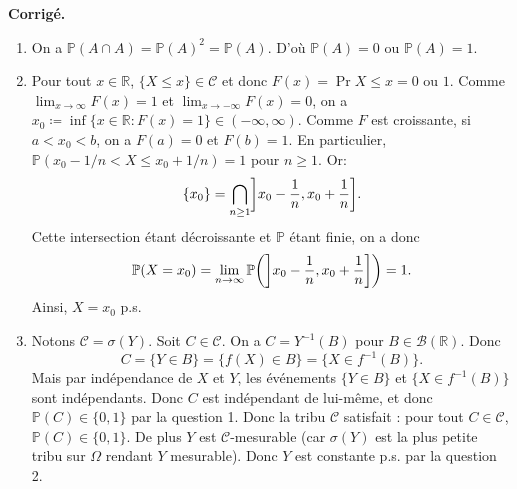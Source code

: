 \documentclass[a4paper,11pt]{article}
\let\originalleft\left
\let\originalright\right
\renewcommand{\left}{\mathopen{}\mathclose\bgroup\originalleft}
\renewcommand{\right}{\aftergroup\egroup\originalright}
\newcommand{\R}{\mathbb{R}}
\renewcommand{\P}{\mathbb{P}}
\newcommand{\1}{\mathbbm{1}}
\newcommand{\cB}{\mathcal{B}}
\newcommand{\cC}{\mathcal{C}}
\theoremstyle{plain}
\theoremstyle{definition}
\renewenvironment{comment}{\medskip\noindent \textcolor{BrickRed}{\textbf{Corrigé.}}}{}
\begin{document}
\begin{comment}
\begin{enumerate}
\item On a $\P(A \cap A)= \P(A)^2= \P(A)$. D'où $\P(A)=0$ ou $\P(A)=1$.
\item Pour tout $x \in \R$, $\{X \leq x\} \in \mathcal{C}$ et donc $F(x) = \Pr{X \leq x}=0$ ou $1$.
Comme $\lim_{x \rightarrow \infty} F(x)=1$ et $\lim_{x \rightarrow -\infty} F(x)=0$, on a $x_0 \coloneqq \inf  \{x \in \R : F(x)=1\} \in (- \infty, \infty)$.
Comme $F$ est croissante, si $a<x_0<b$, on a $F(a)=0$ et $F(b)=1$.
En particulier, $ \P( x_0-1/n < X \leq x_0+1/n)=1$ pour $n \geq 1$.
Or:
\[
	\{x_0\}= \bigcap_{n \geq 1} \left] x_0- \frac{1}{n}, x_{0}+ \frac{1}{n} \right].
\]
Cette intersection \'etant d\'ecroissante et $\P$ \'etant finie, on a donc
\[
	\P(X=x_0)
	= \lim_{n \to \infty} \P \left( \left] x_0- \frac{1}{n}, x_0+ \frac{1}{n} \right] \right)
	=1.
\]
Ainsi, $X=x_0$ p.s.
\item Notons $\mathcal{C}= \sigma(Y)$.
Soit $C \in \cC$. On a $C = Y^{-1}(B)$ pour $B\in\cB(\R)$.
Donc
\[
	C = \{Y \in B\} = \{f(X) \in B\} = \{ X \in f^{-1}(B) \}.
\]
Mais par indépendance de $X$ et $Y$, les événements $\{Y \in B\}$ et $\{ X \in f^{-1}(B) \}$ sont indépendants.
Donc $C$ est ind\'ependant de lui-m\^eme, et donc $\P(C) \in \{0,1\}$ par la question 1.
Donc la tribu $\cC$ satisfait : pour tout $C \in \mathcal{C}$, $\P(C) \in \{0,1\}$.
De plus $Y$ est $\cC$-mesurable (car $\sigma(Y)$ est la plus petite tribu sur $\Omega$ rendant $Y$ mesurable).
Donc $Y$ est constante p.s. par la question 2.
\end {enumerate}
\end{comment}
\end{document}
